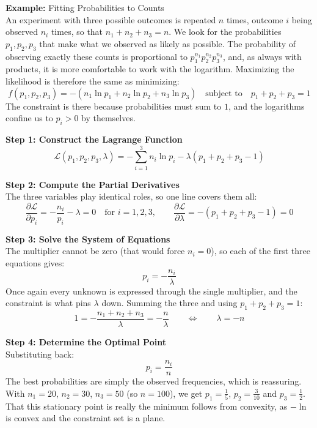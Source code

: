 \documentclass[]{article}
\begin{document}
	\vspace{1cm}
	\textbf{Example:}
	Fitting Probabilities to Counts\\
	An experiment with three possible outcomes is repeated $n$ times, outcome $i$ being observed $n_i$ times, so that $n_1 + n_2 + n_3 = n$.
	We look for the probabilities $p_1, p_2, p_3$ that make what we observed as likely as possible.
	The probability of observing exactly these counts is proportional to $p_1^{n_1} p_2^{n_2} p_3^{n_3}$, and, as always with products, it is more comfortable to work with the logarithm.
	Maximizing the likelihood is therefore the same as minimizing:
	$$
	f(p_1, p_2, p_3) = - \left( n_1 \ln p_1 + n_2 \ln p_2 + n_3 \ln p_3 \right)
	\quad \text{subject to} \quad
	p_1 + p_2 + p_3 = 1
	$$
	The constraint is there because probabilities must sum to $1$, and the logarithms confine us to $p_i > 0$ by themselves.

	\textbf{Step 1: Construct the Lagrange Function}\\
	$$
	\mathcal{L}(p_1, p_2, p_3, \lambda)
	= - \sum_{i=1}^3 n_i \ln p_i - \lambda \left( p_1 + p_2 + p_3 - 1 \right)
	$$

	\textbf{Step 2: Compute the Partial Derivatives}\\
	The three variables play identical roles, so one line covers them all:
	$$
	\frac{\partial \mathcal{L}}{\partial p_i} = - \frac{n_i}{p_i} - \lambda = 0
	\quad \text{for } i = 1, 2, 3,
	\qquad
	\frac{\partial \mathcal{L}}{\partial \lambda} = - \left( p_1 + p_2 + p_3 - 1 \right) = 0
	$$

	\textbf{Step 3: Solve the System of Equations}\\
	The multiplier cannot be zero (that would force $n_i = 0$), so each of the first three equations gives:
	$$
	p_i = - \frac{n_i}{\lambda}
	$$
	Once again every unknown is expressed through the single multiplier, and the constraint is what pins $\lambda$ down.
	Summing the three and using $p_1 + p_2 + p_3 = 1$:
	$$
	1 = - \frac{n_1 + n_2 + n_3}{\lambda} = - \frac{n}{\lambda}
	\qquad \Longleftrightarrow \qquad
	\lambda = -n
	$$

	\textbf{Step 4: Determine the Optimal Point}\\
	Substituting back:
	$$
	\boxed{\ p_i = \frac{n_i}{n}\ }
	$$
	The best probabilities are simply the observed frequencies, which is reassuring.
	With $n_1 = 20$, $n_2 = 30$, $n_3 = 50$ (so $n = 100$), we get $p_1 = \frac{1}{5}$, $p_2 = \frac{3}{10}$ and $p_3 = \frac{1}{2}$.
	That this stationary point is really the minimum follows from convexity, as $-\ln$ is convex and the constraint set is a plane.
\end{document}
